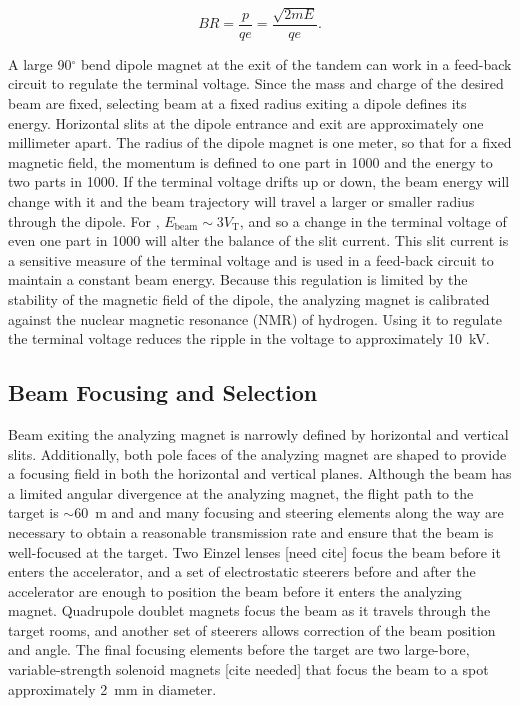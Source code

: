 \begin{equation}
BR = \frac{p}{qe} = \frac{\sqrt{2mE}}{qe}.
\label{eqn:rigidity}
\end{equation}

A large 90$^{\circ}$ bend dipole magnet at the exit of the tandem can work in a feed-back circuit to regulate the terminal voltage.  Since the mass and charge of the desired beam are fixed, selecting beam at a fixed radius exiting a dipole defines its energy.  Horizontal slits at the dipole entrance and exit are approximately one millimeter apart.  The radius of the dipole magnet is one meter, so that for a fixed magnetic field, the momentum is defined to one part in 1000 and the energy to two parts in 1000.  If the terminal voltage drifts up or down, the beam energy will change with it and the beam trajectory will travel a larger or smaller radius through the dipole.  For , $E_{\text{beam}}\sim3V_{\text{T}}$, and so a change in the terminal voltage of even one part in 1000 will alter the balance of the slit current.  This slit current is a sensitive measure of the terminal voltage and is used in a feed-back circuit to maintain a constant beam energy.  Because this regulation is limited by the stability of the magnetic field of the dipole, the analyzing magnet is calibrated against the nuclear magnetic resonance (NMR) of hydrogen.  Using it to regulate the terminal voltage reduces the ripple in the voltage to approximately 10~kV.


\subsection{Beam Focusing and Selection}

Beam exiting the analyzing magnet is narrowly defined by horizontal and vertical slits.  Additionally, both pole faces of the analyzing magnet are shaped to provide a focusing field in both the horizontal and vertical planes.  Although the beam has a limited angular divergence at the analyzing magnet, the flight path to the target is $\sim60$~m and and many focusing and steering elements along the way are necessary to obtain a reasonable transmission rate and ensure that the beam is well-focused at the target.  Two Einzel lenses [need cite] focus the beam before it enters the accelerator, and a set of electrostatic steerers before and after the accelerator are enough to position the beam before it enters the analyzing magnet.  Quadrupole doublet magnets focus the beam as it travels through the target rooms, and another set of steerers allows correction of the beam position and angle.  The final focusing elements before the target are two large-bore, variable-strength solenoid magnets [cite needed] that focus the beam to a spot approximately 2~mm in diameter.

